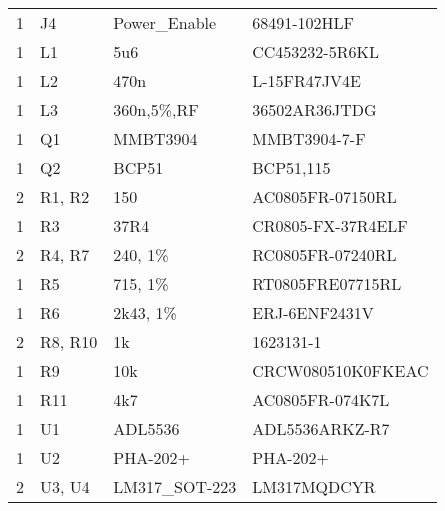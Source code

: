 \begin{center}
\begin{tabular}{@{} llll @{}}
        1   & J4                        & Power\_Enable               & 68491-102HLF       \\
        1   & L1                        & 5u6                         & CC453232-5R6KL     \\
        1   & L2                        & 470n                        & L-15FR47JV4E       \\
        1   & L3                        & 360n,5\%,RF                 & 36502AR36JTDG      \\
        1   & Q1                        & MMBT3904                    & MMBT3904-7-F       \\
        1   & Q2                        & BCP51                       & BCP51,115          \\
        2   & R1, R2                    & 150                         & AC0805FR-07150RL   \\
        1   & R3                        & 37R4                        & CR0805-FX-37R4ELF  \\
        2   & R4, R7                    & 240, 1\%                    & RC0805FR-07240RL   \\
        1   & R5                        & 715, 1\%                    & RT0805FRE07715RL   \\
        1   & R6                        & 2k43, 1\%                   & ERJ-6ENF2431V      \\
        2   & R8, R10                   & 1k                          & 1623131-1          \\
        1   & R9                        & 10k                         & CRCW080510K0FKEAC  \\
        1   & R11                       & 4k7                         & AC0805FR-074K7L    \\
        1   & U1                        & ADL5536                     & ADL5536ARKZ-R7     \\
        1   & U2                        & PHA-202+                    & PHA-202+           \\
        2   & U3, U4                    & LM317\_SOT-223              & LM317MQDCYR        \\
        \bottomrule
    \end{tabular}
\end{center}


\newpage
